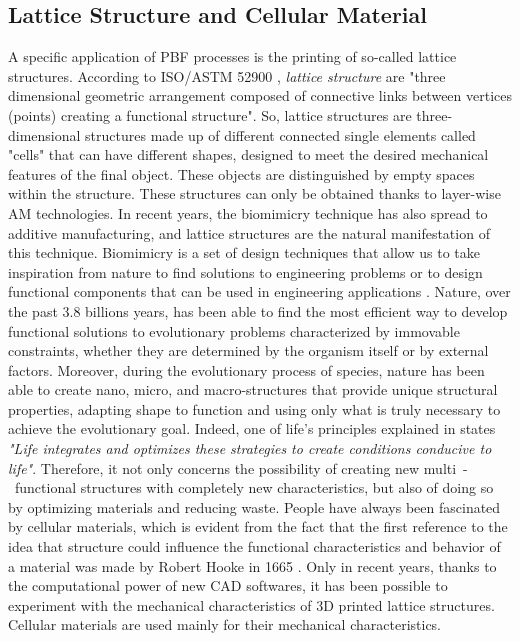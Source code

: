 \subsection{Lattice Structure and Cellular Material} \label{subsec:lattice}
A specific application of PBF processes is the printing of so-called lattice structures. According to ISO/ASTM 52900 \cite{international_standard_organization_isoastm_2015}, \emph{lattice structure} are "three dimensional geometric arrangement composed of connective links between vertices (points) creating a functional structure". So, lattice structures are three-dimensional structures made up of different connected single elements called "cells" that can have different shapes, designed to meet the desired mechanical features of the final object. These objects are distinguished by empty spaces within the structure. These structures can only be obtained thanks to layer-wise AM technologies. In recent years, the biomimicry technique has also spread to additive manufacturing, and lattice structures are the natural manifestation of this technique. Biomimicry is a set of design techniques that allow us to take inspiration from nature to find solutions to engineering problems or to design functional components that can be used in engineering applications \cite{pathak_biomimicry_2019, du_plessis_beautiful_2019}. Nature, over the past 3.8 billions years, has been able to find the most efficient way to develop functional solutions to evolutionary problems characterized by immovable constraints, whether they are determined by the organism itself or by external factors. Moreover, during the evolutionary process of species, nature has been able to create nano, micro, and macro-structures that provide unique structural properties, adapting shape to function and using only what is truly necessary to achieve the evolutionary goal. Indeed, one of life's principles explained in \citeauthor{baumeister_biomimicry_2011} states \textit{"Life integrates and optimizes these strategies to create conditions conducive to life"}. Therefore, it not only concerns the possibility of creating new multi~-~functional structures with completely new characteristics, but also of doing so by optimizing materials and reducing waste. People have always been fascinated by cellular materials, which is evident from the fact that the first reference to the idea that structure could influence the functional characteristics and behavior of a material was made by Robert Hooke in 1665 \cite{l_gibson_cellular_2010}. Only in recent years, thanks to the computational power of new CAD softwares, it has been possible to experiment with the mechanical characteristics of 3D printed lattice structures. Cellular materials are used mainly for their mechanical characteristics.
